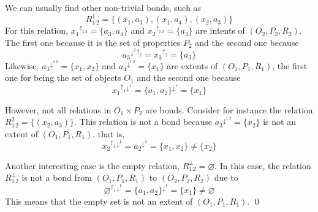 \documentclass[runningheads,a4paper]{llncs}
\newcommand{\K}{\mathbb{K}}
\newcommand{\up}[1][]{{^{\uparrow_{#1}}}}
\newcommand{\down}[1][]{{^{\downarrow^{#1}}}}
\renewcommand{\emptyset}{\varnothing}
\newcommand{\editornote}[1]{{\normalfont \textcolor{red}{[#1]}}}
\begin{document}
\begin{example}
We can usually find other non-trivial bonds, such as%
\[
R_{1\,2}^1 = \{(x_1, a_3), (x_1, a_4), (x_2, a_3)\}
\]
For this relation, $x_1\up[1\,2] = \{a_3, a_4\}$ and $x_2\up[1\,2] = \{a_3\}$ are intents of $(O_2, P_2, R_2)$. The first one because it is the set of properties $P_2$ and the second one because
\[
a_3\down[2]\up[2] = x_3\up[2] = \{a_3\}
\]
Likewise, $a_3\down[1\,2] = \{x_1, x_2\}$ and $a_4\down[1\,2] = \{x_1\}$ are extents of $(O_1, P_1, R_1)$, the first one for being the set of objects $O_1$ and the second one because
\[
x_1\up[1]\down[1] = \{a_1, a_2\}\down[1] = \{x_1\}
\]

However, not all relations in $O_1 \times P_2$ are bonds. Consider for instance the relation $R_{1\,2}^2 = \{(x_2, a_3)\}$. This relation is not a bond because $a_3\down[1\,2] = \{x_2\}$ is not an extent of $(O_1, P_1, R_1)$, that is, 
\[
x_2\up[1]\down[1] = a_2\down[1] = \{x_1, x_2\} \neq \{x_2\}
\]

Another interesting case is the empty relation, $R_{1\,2}^\bot = \emptyset$. In this case, the relation $R_{1\,2}^\bot$ is not a bond from $(O_1, P_1, R_1)$ to $(O_2, P_2, R_2)$ due to
\[
\varnothing\up[1]\down[1] = \{a_1, a_2\}\down[1] = \{x_1\} \neq \varnothing
\]
This means that the empty set is not an extent of $(O_1, P_1, R_1)$. \qed

\end{example}
\end{document}
